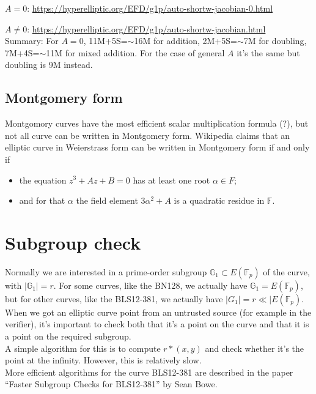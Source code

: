 \documentclass[12pt,draft,a4paper,openany,oneside]{amsbook}
\def\F{\mathbb{F}}
\def\G{\mathbb{G}}
\theoremstyle{plain}
\theoremstyle{definition}
\begin{document}
\noindent 
$A=0$:    \url{https://hyperelliptic.org/EFD/g1p/auto-shortw-jacobian-0.html}

\noindent
$A\neq0$: \url{https://hyperelliptic.org/EFD/g1p/auto-shortw-jacobian.html} \\

Summary: For $A=0$, 11M+5S=$\sim$16M for addition, 2M+5S=$\sim$7M for doubling,
7M+4S=$\sim$11M for mixed addition.
For the case of general $A$ it's the same but doubling is 9M instead.

\subsection{Montgomery form}
Montgomory curves have the most efficient scalar multiplication formula (?), but
not all curve can be written in Montgomery form. Wikipedia claims that an 
elliptic curve in Weierstrass form can be written in Montgomery form if and only if
\begin{itemize}
\item the equation $z^3 + Az + B=0$ has at least one root $\alpha\in F$;
\item and for that $\alpha$ the field element $3\alpha^2 + A$ is a quadratic residue in $\F$.
\end{itemize}


\section{Subgroup check}

Normally we are interested in a prime-order subgroup $\G_1 \subset E(\F_p)$
of the curve, with $|\G_1|=r$. For some curves, like the BN128, we actually
have $\G_1 = E(\F_p)$, but for other curves, like the BLS12-381, we actually
have $|G_1|=r\ll |E(\F_p)$. When we got an elliptic curve point from an
untrusted source (for example in the verifier), it's important to check both
that it's a point on the curve and that it is a point on the required subgroup.\\

A simple algorithm for this is to compute $r*(x,y)$ and check whether it's
the point at the infinity. However, this is relatively slow.\\

More efficient algorithms for the curve BLS12-381 are described in the paper
``Faster Subgroup Checks for BLS12-381'' by Sean Bowe.
\end{document}
